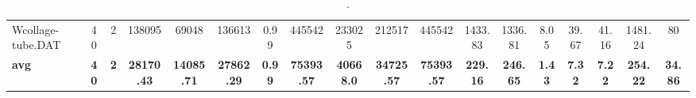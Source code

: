 \begin{sidewaystable}[h]
{\begin{tabular}{lccccccccccccccccc}
Wcollage-tube.DAT & 40 & 2 & 138095 & 69048 & 136613 & 0.99 & 445542 & 233025 & 212517 & 445542 & 1433.83 & 1336.81 & 8.05 & 39.67 & 41.16 & 1481.24 & 80\\
\cline{1-18} \textbf{avg} & \textbf{40} & \textbf{2} & \textbf{28170.43} & \textbf{14085.71} & \textbf{27862.29} & \textbf{0.99} & \textbf{75393.57} & \textbf{40668.0} & \textbf{34725.57} & \textbf{75393.57} & \textbf{229.16} & \textbf{246.65} & \textbf{1.43} & \textbf{7.32} & \textbf{7.22} & \textbf{254.22} & \textbf{34.86} \\ \cline{1-18}
\bottomrule
\end{tabular}%
}%
\caption{.}
\label{tab:table_bc}
\end{sidewaystable}

